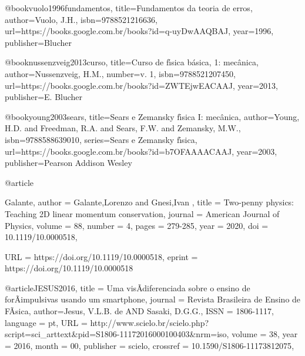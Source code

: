 
@book{vuolo1996fundamentos,
  title={Fundamentos da teoria de erros},
  author={Vuolo, J.H.},
  isbn={9788521216636},
  url={https://books.google.com.br/books?id=q-uyDwAAQBAJ},
  year={1996},
  publisher={Blucher}
}

@book{nussenzveig2013curso,
  title={Curso de f{\'\i}sica b{\'a}sica, 1: mec{\^a}nica},
  author={Nussenzveig, H.M.},
  number={v. 1},
  isbn={9788521207450},
  url={https://books.google.com.br/books?id=ZWTEjwEACAAJ},
  year={2013},
  publisher={E. Blucher}
}

@book{young2003sears,
  title={Sears e Zemansky f{\'\i}sica I: mec{\^a}nica},
  author={Young, H.D. and Freedman, R.A. and Sears, F.W. and Zemansky, M.W.},
  isbn={9788588639010},
  series={Sears e Zemansky f{\'\i}sica},
  url={https://books.google.com.br/books?id=b7OFAAAACAAJ},
  year={2003},
  publisher={Pearson Addison Wesley}
}

@article{Galante,
author = {Galante,Lorenzo  and Gnesi,Ivan },
title = {Two-penny physics: Teaching 2D linear momentum conservation},
journal = {American Journal of Physics},
volume = {88},
number = {4},
pages = {279-285},
year = {2020},
doi = {10.1119/10.0000518},

URL = { 
        https://doi.org/10.1119/10.0000518},
eprint = {https://doi.org/10.1119/10.0000518}
}

@article{JESUS2016,
   title = {{Uma vis\~A\poundso diferenciada sobre o ensino de for\~A\Sas impulsivas usando um smartphone}},
   journal = {{Revista Brasileira de Ensino de F\~A\-sica}},
   author={Jesus, V.L.B. de AND Sasaki, D.G.G.},
   ISSN = {1806-1117},
   language = {pt},
   URL = {http://www.scielo.br/scielo.php?script=sci_arttext&pid=S1806-11172016000100403&nrm=iso},
   volume = {38},
   year = {2016},
   month = {00},
   publisher = {scielo},
   crossref = {10.1590/S1806-11173812075},
}


